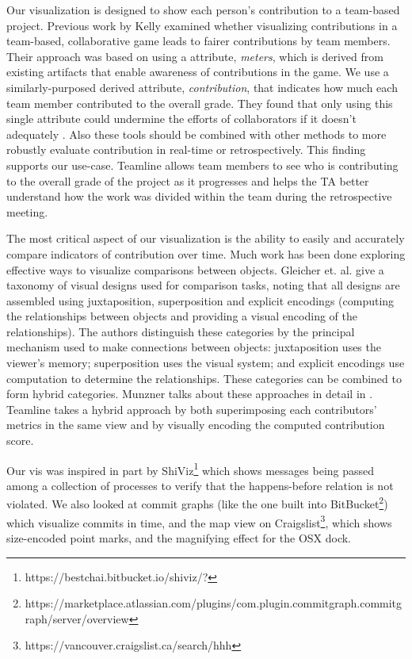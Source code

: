 \documentclass[../manifest.tex]{subfiles}
\begin{document}
Our visualization is designed to show each person's contribution to a team-based project. Previous work by Kelly \cite{Kelly:2016} examined whether visualizing contributions in a team-based, collaborative game leads to fairer contributions by team members. Their approach was based on using a attribute, \textit{meters}, which is derived from existing artifacts that enable awareness of contributions in the game. We use a similarly-purposed derived attribute, \textit{contribution}, that indicates how much each team member contributed to the overall grade. They found that only using this single attribute could undermine the efforts of collaborators if it doesn't adequately  \cite{Kelly:2016}. Also these tools should be combined with other methods to more robustly evaluate contribution in real-time or retrospectively. This finding supports our use-case. Teamline allows team members to see who is contributing to the overall grade of the project as it progresses and helps the TA better understand how the work was divided within the team during the retrospective meeting.

The most critical aspect of our visualization is the ability to easily and accurately compare indicators of contribution over time. Much work has been done exploring effective ways to visualize comparisons between objects. Gleicher et. al.\cite{Gleicher:2011} give a taxonomy of visual designs used for comparison tasks, noting that all designs are assembled using juxtaposition, superposition and explicit encodings (computing the relationships between objects and providing a visual encoding of the relationships). The authors distinguish these categories by the principal mechanism used to make connections between objects: juxtaposition uses the viewer’s memory; superposition uses the visual system; and explicit encodings use computation to determine the relationships. These categories can be combined to form hybrid categories. Munzner talks about these approaches in detail in \cite{Munzner:2014}. Teamline takes a hybrid approach by both superimposing each contributors' metrics in the same view and by visually encoding the computed contribution score.

Our vis was inspired in part by ShiViz\footnote{https://bestchai.bitbucket.io/shiviz/?}\cite{Abrahamson:2014} which shows messages being passed among a collection of processes to verify that the happens-before relation is not violated. We also looked at commit graphs (like the one built into BitBucket\footnote{https://marketplace.atlassian.com/plugins/com.plugin.commitgraph.commitgraph/server/overview}) which visualize commits in time, and the map view on Craigslist\footnote{https://vancouver.craigslist.ca/search/hhh}, which shows size-encoded point marks, and the magnifying effect for the OSX dock.
\end{document}
